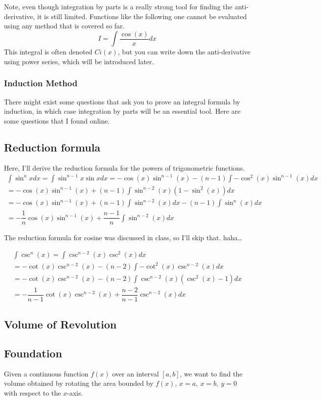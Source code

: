 \documentclass{article}
\theoremstyle{definition}
\theoremstyle{definition}
\theoremstyle{definition}
\theoremstyle{definition}
\theoremstyle{definition}
\theoremstyle{definition}
\theoremstyle{definition}
\theoremstyle{definition}
\theoremstyle{definition}
\begin{document}
Note, even though integration by parts is a really strong tool for finding the anti-derivative, it is still limited. Functions like the following one cannot be evaluated using any method that is covered so far.
\[I=\int\dfrac{\cos(x)}{x}dx\]
This integral is often denoted $Ci(x)$, but you can write down the anti-derivative using power series, which will be introduced later.

\subsubsection{Induction Method}
There might exist some questions that ask you to prove an integral formula by induction, in which case integration by parts will be an essential tool. Here are some questions that I found online.
\subsection{Reduction formula}
Here, I'll derive the reduction formula for the powers of trigonometric functions.
\begin{align*}
    \int\sin^nxdx=\int\sin^{n-1}x\sin xdx=-\cos(x)\sin^{n-1}(x)-(n-1)\int-\cos^2(x)\sin^{n-1}(x)dx\\
    = -\cos(x)\sin^{n-1}(x)+(n-1)\int\sin^{n-2}(x)(1-\sin^2(x))dx\\
    = -\cos(x)\sin^{n-1}(x)+(n-1)\int\sin^{n-2}(x)dx-(n-1)\int\sin^n(x)dx\\
    = -\dfrac{1}{n}\cos(x)\sin^{n-1}(x)+\dfrac{n-1}{n}\int\sin^{n-2}(x)dx
\end{align*}

The reduction formula for cosine was discussed in class, so I'll skip that. haha\dots

\begin{align*}
    \int\csc^n(x)=\int\csc^{n-2}(x)\csc^2(x)dx\\
    =-\cot(x)\csc^{n-2}(x)-(n-2)\int -\cot^2(x)\csc^{n-2}(x)dx\\
    =-\cot(x)\csc^{n-2}(x)-(n-2)\int\csc^{n-2}(x)(\csc^2(x)-1)dx\\
    =-\dfrac{1}{n-1}\cot(x)\csc^{n-2}(x)+\dfrac{n-2}{n-1}\csc^{n-2}(x)dx
\end{align*}

\subsection{Volume of Revolution}
\subsection{Foundation}
Given a continuous function $f(x)$ over an interval $[a,b]$,
we want to find the volume obtained by rotating the area bounded by $f(x)$, $x=a,\ x=b,\ y=0$ with respect to the $x$-axis.
\end{document}
